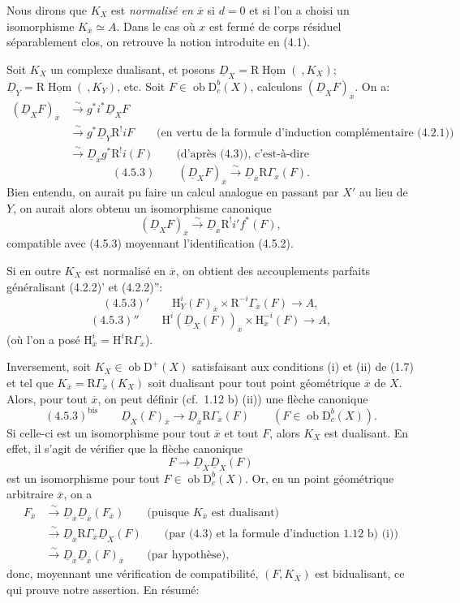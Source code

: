 \documentclass[11pt]{article}
\renewcommand{\H}{\mathrm{H}}
\DeclareMathOperator{\Hom}{Hom}
\newcommand{\R}{\mathrm{R}}
\newcommand{\D}{\mathrm{D}}
\newcommand{\ob}{\operatorname{ob}}
\newcommand{\ol}[1]{\overline{#1}}
\providecommand{\Hom}{\operatorname{Hom}}
\providecommand{\ob}{\operatorname{ob}}
\begin{document}
Nous dirons que $K_X$ est \emph{normalisé en $\ol{x}$} si $d=0$ et si l'on a choisi un isomorphisme $K_{\ol{x}}\simeq A$. Dans le cas où $x$ est fermé de corps résiduel séparablement clos, on retrouve la notion introduite en (4.1).

Soit $K_X$ un complexe dualisant, et posons $\underline{D}_X=\R\underline{\Hom}(\ ,K_X)$; $\underline{D}_Y=\R\underline{\Hom}(\ ,K_Y)$, etc. Soit $F\in\ob\D_c^b(X)$, calculons $(\underline{D}_XF)_{\ol{x}}$. On a:
\[
\begin{aligned}
(\underline{D}_XF)_{\ol{x}}&\xrightarrow{\sim}g^*i^*\underline{D}_X F\\
&\xrightarrow{\sim}g^*\underline{D}_Y\R^{!}iF\qquad\text{(en vertu de la formule d'induction complémentaire (4.2.1))}\\
&\xrightarrow{\sim}\underline{D}_{\ol{x}}g^*\R^{!}i(F)\qquad\text{(d'après (4.3)), c'est-à-dire}
\end{aligned}
\]
\[
(4.5.3)\qquad (\underline{D}_X F)_{\ol{x}}\xrightarrow{\sim}\underline{D}_{\ol{x}}\R\Gamma_{\ol{x}}(F).
\]
Bien entendu, on aurait pu faire un calcul analogue en passant par $X'$ au lieu de $Y$, on aurait alors obtenu un isomorphisme canonique
\[
(\underline{D}_XF)_{\ol{x}}\xrightarrow{\sim}\underline{D}_{\ol{x}}\R^{!}i'f^*(F),
\]
compatible avec (4.5.3) moyennant l'identification (4.5.2).

Si en outre $K_X$ est normalisé en $\ol{x}$, on obtient des accouplements parfaits généralisant (4.2.2)' et (4.2.2)'':
\[
(4.5.3)'\qquad \H_Y^i(F)_{\ol{x}}\times \R^{-i}\Gamma_{\ol{x}}(F)\longrightarrow A,
\]
\[
(4.5.3)''\qquad \H^i(\underline{D}_X(F))_{\ol{x}}\times \H_{\ol{x}}^{-i}(F)\longrightarrow A,
\]
(où l'on a posé $\H_{\ol{x}}^i=\H^i\R\Gamma_{\ol{x}}$).

Inversement, soit $K_X\in\ob\D^+(X)$ satisfaisant aux conditions (i) et (ii) de (1.7) et tel que $K_{\ol{x}}=\R\Gamma_{\ol{x}}(K_X)$ soit dualisant pour tout point géométrique $\ol{x}$ de $X$. Alors, pour tout $\ol{x}$, on peut définir (cf.~1.12 b) (ii)) une flèche canonique
\[
(4.5.3)^{\mathrm{bis}}\qquad \underline{D}_X(F)_{\ol{x}}\longrightarrow \underline{D}_{\ol{x}}\R\Gamma_{\ol{x}}(F)\qquad (F\in\ob\D_c^b(X)).
\]
Si celle-ci est un isomorphisme pour tout $\ol{x}$ et tout $F$, alors $K_X$ est dualisant. En effet, il s'agit de vérifier que la flèche canonique
\[
F\longrightarrow \underline{D}_X\underline{D}_X(F)
\]
est un isomorphisme pour tout $F\in\ob\D_c^b(X)$. Or, en un point géométrique arbitraire $\ol{x}$, on a
\[
\begin{aligned}
F_{\ol{x}}&\xrightarrow{\sim}\underline{D}_{\ol{x}}\underline{D}_{\ol{x}}(F_{\ol{x}})\qquad\text{(puisque $K_{\ol{x}}$ est dualisant)}\\
&\xrightarrow{\sim}\underline{D}_{\ol{x}}\R\Gamma_{\ol{x}}\underline{D}_X(F)\qquad\text{(par (4.3) et la formule d'induction 1.12 b) (i))}\\
&\xrightarrow{\sim}\underline{D}_{\ol{x}}\underline{D}_{\ol{x}}(F)_{\ol{x}}\qquad\text{(par hypothèse)},
\end{aligned}
\]
donc, moyennant une vérification de compatibilité, $(F,K_X)$ est bidualisant, ce qui prouve notre assertion. En résumé:
\end{document}
